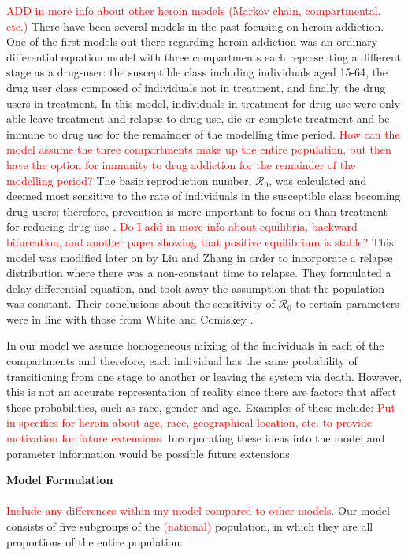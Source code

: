 \documentclass[12pt]{article}
\begin{document}
\textcolor{red}{ADD in more info about other heroin models (Markov chain, compartmental, etc.)}
There have been several models in the past focusing on heroin addiction. One of the first models out there regarding heroin addiction was an ordinary differential equation model with three compartments each representing a different stage as a drug-user: the susceptible class including individuals aged 15-64, the drug user class composed of individuals not in treatment, and finally, the drug users in treatment. In this model, individuals in treatment for drug use were only able leave treatment and relapse to drug use, die or complete treatment and be immune to drug use for the remainder of the modelling time period. \textcolor{red}{How can the model assume the three compartments make up the entire population, but then have the option for immunity to drug addiction for the remainder of the modelling period?} The basic reproduction number, $\mathscr{R}_0$, was calculated and deemed most sensitive to the rate of individuals in the susceptible class becoming drug users; therefore, prevention is more important to focus on than treatment for reducing drug use \cite{White}. \textcolor{red}{Do I add in more info about equilibria, backward bifurcation, and another paper showing that positive equilibrium is stable?} This model was modified later on by Liu and Zhang in order to incorporate a relapse distribution where there was a non-constant time to relapse. They formulated a delay-differential equation, and took away the assumption that the population was constant. Their conclusions about the sensitivity of $\mathscr{R}_0$ to certain parameters were in line with those from White and Comiskey \cite{Liu}. 

In our model we assume homogeneous mixing of the individuals in each of the compartments and therefore, each individual has the same probability of transitioning from one stage to another or leaving the system via death. However, this is not an accurate representation of reality since there are factors that affect these probabilities, such as race, gender and age. Examples of these include: \textcolor{red}{Put in specifics for heroin about age, race, geographical location, etc. to provide motivation for future extensions.} Incorporating these ideas into the model and parameter information would be possible future extensions. 

\textbf{Model Formulation} \\ \\
\textcolor{red}{Include any differences within my model compared to other models.}
Our model consists of five subgroups of the \textcolor{red}{(national)} population, in which they are all proportions of the entire population: 
\end{document}
